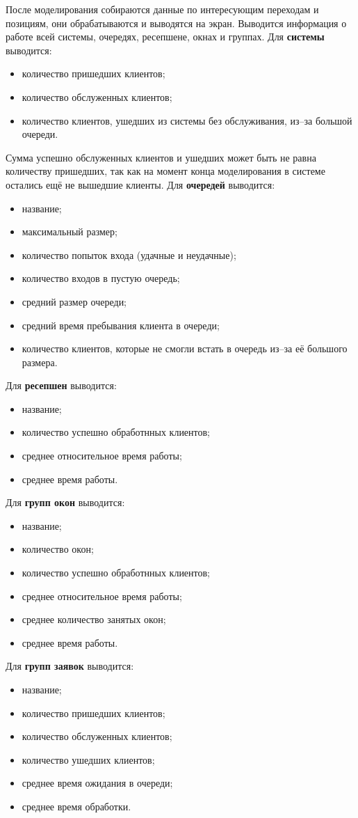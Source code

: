 После моделирования собираются данные по интересующим переходам и позициям, они обрабатываются и выводятся на экран. Выводится информация о работе всей системы, очередях, ресепшене, окнах и группах.
Для \textbf{системы} выводится:
\begin{itemize}[label=---]
	\item количество пришедших клиентов;
	\item количество обслуженных клиентов;
	\item количество клиентов, ушедших из системы без обслуживания, из--за большой очереди.
\end{itemize}
Сумма успешно обслуженных клиентов и ушедших может быть не равна количеству пришедших, так как на момент конца моделирования в системе остались ещё не вышедшие клиенты.
Для \textbf{очередей} выводится:
\begin{itemize}[label=---]
	\item название;
	\item максимальный размер;
	\item количество попыток входа (удачные и неудачные);
	\item количество входов в пустую очередь;
	\item средний размер очереди;
	\item средний время пребывания клиента в очереди;
	\item количество клиентов, которые не смогли встать в очередь из--за её большого размера.
\end{itemize}
Для \textbf{ресепшен} выводится:
\begin{itemize}[label=---]
	\item название;
	\item количество успешно обработнных клиентов;
	\item среднее относительное время работы;
	\item среднее время работы.
\end{itemize}
Для \textbf{групп окон} выводится:
\begin{itemize}[label=---]
	\item название;
	\item количество окон;
	\item количество успешно обработнных клиентов;
	\item среднее относительное время работы;
	\item среднее количество занятых окон;
	\item среднее время работы.
\end{itemize}
Для \textbf{групп заявок} выводится:
\begin{itemize}[label=---]
	\item название;
	\item количество пришедших клиентов;
	\item количество обслуженных клиентов;
	\item количество ушедших клиентов;
	\item среднее время ожидания в очереди;
	\item среднее время обработки.
\end{itemize}

